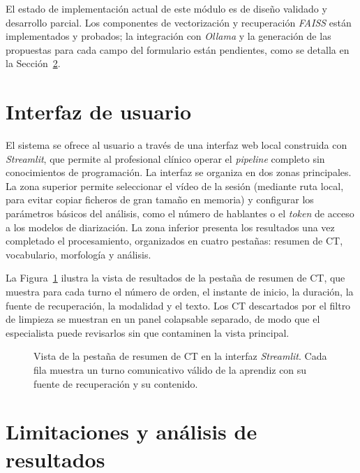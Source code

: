 El estado de implementación actual de este módulo es de diseño validado y desarrollo
parcial. Los componentes de vectorización y recuperación \emph{FAISS} están
implementados y probados; la integración con \emph{Ollama} y la generación de las
propuestas para cada campo del formulario están pendientes, como se detalla en la
Sección~\ref{sec:limitaciones}.


\section{Interfaz de usuario}
\label{sec:interfaz}

El sistema se ofrece al usuario a través de una interfaz web local construida con
\emph{Streamlit}, que permite al profesional clínico operar el \emph{pipeline}
completo sin conocimientos de programación. La interfaz se organiza en dos zonas
principales. La zona superior permite seleccionar el vídeo de la sesión (mediante ruta
local, para evitar copiar ficheros de gran tamaño en memoria) y configurar los
parámetros básicos del análisis, como el número de hablantes o el \emph{token} de
acceso a los modelos de diarización. La zona inferior presenta los resultados una vez
completado el procesamiento, organizados en cuatro pestañas: resumen de \ac{CT},
vocabulario, morfología y análisis.

La Figura~\ref{fig:interfaz} ilustra la vista de resultados de la pestaña de resumen
de \ac{CT}, que muestra para cada turno el número de orden, el instante de inicio, la
duración, la fuente de recuperación, la modalidad y el texto. Los \ac{CT} descartados
por el filtro de limpieza se muestran en un panel colapsable separado, de modo que el
especialista puede revisarlos sin que contaminen la vista principal.

\begin{figure}[h]
  \centering
  \caption[Interfaz Streamlit]{Vista de la pestaña de resumen de \ac{CT} en la interfaz
    \emph{Streamlit}. Cada fila muestra un turno comunicativo válido de la aprendiz con
    su fuente de recuperación y su contenido.}
  \label{fig:interfaz}
\end{figure}


\section{Limitaciones y análisis de resultados}
\label{sec:limitaciones}

